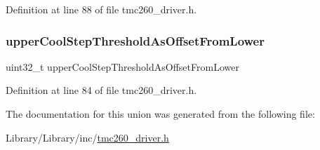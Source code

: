 Definition at line 88 of file tmc260\+\_\+driver.\+h.

\mbox{\label{union_cool_step_control_register___a84ae4a5a201e30da398f39e1a409ee76}} 
\subsubsection{\texorpdfstring{upper\+Cool\+Step\+Threshold\+As\+Offset\+From\+Lower}{upperCoolStepThresholdAsOffsetFromLower}}
{\footnotesize\ttfamily uint32\+\_\+t upper\+Cool\+Step\+Threshold\+As\+Offset\+From\+Lower}



Definition at line 84 of file tmc260\+\_\+driver.\+h.



The documentation for this union was generated from the following file\+:\begin{DoxyCompactItemize}
\item 
Library/\+Library/inc/\mbox{\hyperlink{tmc260__driver_8h}{tmc260\+\_\+driver.\+h}}\end{DoxyCompactItemize}
